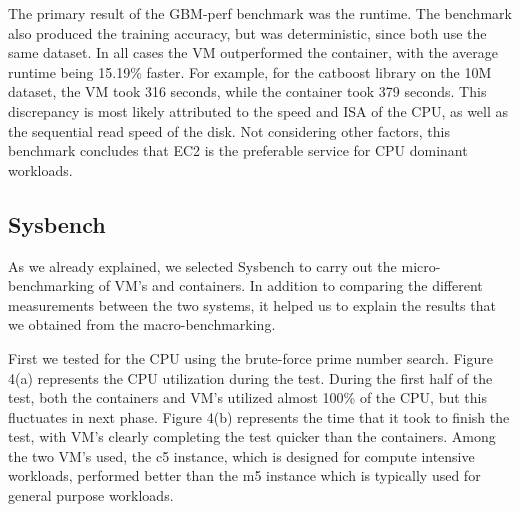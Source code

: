 \documentclass[11pt]{article}
\begin{document}
The primary result of the GBM-perf benchmark was the runtime. The benchmark also produced the training accuracy, but was deterministic, since both use the same dataset. In all cases the VM outperformed the container, with the average runtime being 15.19\% faster. For example, for the catboost library on the 10M dataset, the VM took 316 seconds, while the container took 379 seconds. This discrepancy is most likely attributed to the speed and ISA of the CPU, as well as the sequential read speed of the disk. Not considering other factors, this benchmark concludes that EC2 is the preferable service for CPU dominant workloads.


\subsection{Sysbench}

As we already explained, we selected Sysbench to carry out the micro-benchmarking of VM's and containers. In addition to comparing the different measurements between the two systems, it helped us to explain the results that we obtained from the macro-benchmarking.

First we tested for the CPU using the brute-force prime number search. Figure 4(a) represents the CPU utilization during the test. During the first half of the test, both the containers and VM's utilized almost 100\% of the CPU, but this fluctuates in next phase. Figure 4(b) represents the time that it took to finish the test, with VM's clearly completing the test quicker than the containers. Among the two VM's used, the c5 instance, which is designed for compute intensive workloads, performed better than the m5 instance which is typically used for general purpose workloads. 
\end{document}
